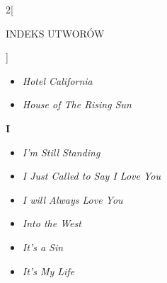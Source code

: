 \documentclass[a4paper]{report}
\begin{document}
\begin{multicols*}{2}[\begin{Huge}INDEKS UTWORÓW\end{Huge}\vspace{1cm}]
\begin{minipage}{\columnwidth}
\begin{itemize}[topsep=6pt, after=\vspace{5mm}, leftmargin=0mm]
		\itemsep0em
		\item[]  \textit{Hotel California}  \\
		\item[]  \textit{House of The Rising Sun}  \\
	\end{itemize}
\end{minipage}
\begin{minipage}{\columnwidth}
\begin{Large}
		\textbf{I}
	\end{Large} 
	\begin{itemize}[topsep=6pt, after=\vspace{1.5mm}, leftmargin=0mm]
		\itemsep0em
		\item[]\textit{I'm Still Standing}  \\
		\item[]  \textit{I Just Called to Say I Love You}  \\
	\end{itemize}
\end{minipage}
\begin{minipage}{\columnwidth}
	\begin{itemize}[topsep=6pt, after=\vspace{1.5mm}, leftmargin=0mm]
		\itemsep0em
		\item[]  \textit{I will Always Love You}  \\
	\end{itemize}
\end{minipage}
\begin{minipage}{\columnwidth}
	\begin{itemize}[topsep=6pt, after=\vspace{1.5mm}, leftmargin=0mm]
		\itemsep0em
		\item[]  \textit{Into the West}  \\
	\end{itemize}
\end{minipage}
\begin{minipage}{\columnwidth}
	\begin{itemize}[topsep=6pt, after=\vspace{5mm}, leftmargin=0mm]
		\itemsep0em
		\item[]  \textit{It's a Sin}  \\
		\item[]  \textit{It's My Life}  \\
	\end{itemize}

\end{minipage}
\end{multicols*}
\end{document}
